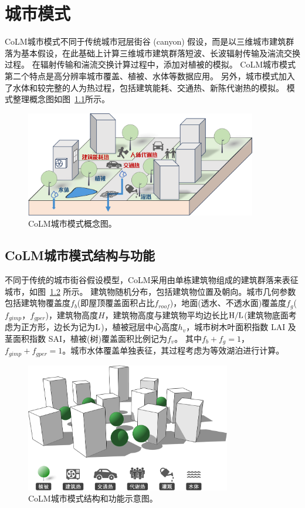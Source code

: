 \chapter{城市模式}\label{城市模式}
CoLM城市模式不同于传统城市冠层街谷 (canyon) 假设，而是以三维城市建筑群落为基本假设，在此基础上计算三维城市建筑群落短波、长波辐射传输及湍流交换过程。
在辐射传输和湍流交换计算过程中，添加对植被的模拟。
CoLM城市模式第二个特点是高分辨率城市覆盖、植被、水体等数据应用。
另外，城市模式加入了水体和较完整的人为热过程，包括建筑能耗、交通热、新陈代谢热的模拟。
模式整理概念图如图~\ref{fig:CoLM城市模式概念图}所示。

{
\begin{figure}[htbp]
\centering
\includegraphics[width=0.9\textwidth]{Figures/城市模式/CoLM城市模式概念图.png}
\caption{CoLM城市模式概念图。}
\label{fig:CoLM城市模式概念图}
\end{figure}
}

\section{CoLM城市模式结构与功能}
不同于传统的城市街谷假设模型，CoLM采用由单栋建筑物组成的建筑群落来表征城市，如图~\ref{fig:CoLM城市模式结构和功能示意图} 所示。
建筑物随机分布，包括建筑物位置及朝向。城市几何参数包括建筑物覆盖度$f_b$(即屋顶覆盖面积占比$f_{roof}$)，地面(透水、不透水面)覆盖度$f_g$($f_{gimp}$，$f_{gper}$)，建筑物高度$H$，建筑物高度与建筑物平均边长比$\rm H/L$(建筑物底面考虑为正方形，边长为记为$\rm L$)，植被冠层中心高度$h_v$，城市树木叶面积指数 LAI 及茎面积指数 SAI，植被(树)覆盖面积比例记为$f_v$。
其中$f_b+f_g=1$，$f_{gimp}+f_{gper}=1$。城市水体覆盖单独表征，其过程考虑为等效湖泊进行计算。

{
\begin{figure}[htbp]
\centering
\includegraphics[width=0.8\textwidth]{Figures/城市模式/CoLM城市模式结构和功能示意图.png}
\caption{CoLM城市模式结构和功能示意图。}
\label{fig:CoLM城市模式结构和功能示意图}
\end{figure}
}

